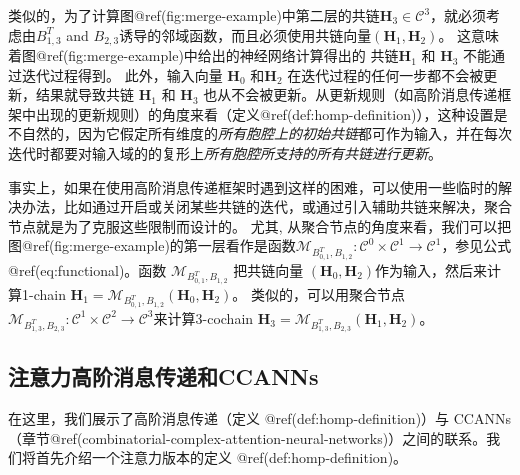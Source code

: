 \documentclass[
  12pt,
]{krantz}
\begin{document}
类似的，为了计算图@ref(fig:merge-example)中第二层的共链\(\mathbf{H}_3 \in  \mathcal{C}^3\)，就必须考虑由\(B_{1,3}^T\)
and
\(B_{2,3}\)诱导的邻域函数，而且必须使用共链向量\((\mathbf{H}_1,\mathbf{H}_2)\)。
这意味着图@ref(fig:merge-example)中给出的神经网络计算得出的
共链\(\mathbf{H}_1\) 和 \(\mathbf{H}_3\) 不能通过迭代过程得到。
此外，输入向量 \(\mathbf{H}_0\) 和\(\mathbf{H}_2\)
在迭代过程的任何一步都不会被更新，结果就导致共链 \(\mathbf{H}_1\) 和
\(\mathbf{H}_3\)
也从不会被更新。从更新规则（如高阶消息传递框架中出现的更新规则）的角度来看（定义@ref(def:homp-definition)），这种设置是不自然的，因为它假定所有维度的\emph{所有胞腔上的初始共链}都可作为输入，并在每次迭代时都要对输入域的的复形上\emph{所有胞腔所支持的所有共链进行更新}。

事实上，如果在使用高阶消息传递框架时遇到这样的困难，可以使用一些临时的解决办法，比如通过开启或关闭某些共链的迭代，或通过引入辅助共链来解决，聚合节点就是为了克服这些限制而设计的。
尤其,
从聚合节点的角度来看，我们可以把图@ref(fig:merge-example)的第一层看作是函数\(\mathcal{M}_{B_{0,1}^T,B_{1,2}}\colon \mathcal{C}^0 \times \mathcal{C}^1 \to \mathcal{C}^1\)，参见公式@ref(eq:functional)。函数
\(\mathcal{M}_{B_{0,1}^T,B_{1,2}}\) 把共链向量
\((\mathbf{H}_0,\mathbf{H}_2)\)作为输入，然后来计算1-chain
\(\mathbf{H}_1 = \mathcal{M}_{B_{0,1}^T,B_{1,2}} (\mathbf{H}_0,\mathbf{H}_2)\)。
类似的，可以用聚合节点\(\mathcal{M}_{B_{1,3}^T, B_{2,3}} \colon
\mathcal{C}^1 \times \mathcal{C}^2 \to \mathcal{C}^3\)来计算3-cochain
\(\mathbf{H}_3=\mathcal{M}_{B_{1,3}^T, B_{2,3}}(\mathbf{H}_1,\mathbf{H}_2)\)。

\subsection{注意力高阶消息传递和CCANNs}\label{attention-higher-order-message-passing-and-ccanns}

在这里，我们展示了高阶消息传递（定义 @ref(def:homp-definition)）与
CCANNs（章节@ref(combinatorial-complex-attention-neural-networks)）之间的联系。我们将首先介绍一个注意力版本的定义
@ref(def:homp-definition)。
\end{document}
